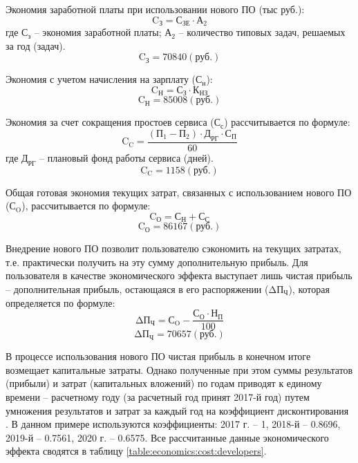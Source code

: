 Экономия заработной платы при использовании нового ПО (тыс руб.):
\begin{equation}
\label{sec:economics:effect:form_zp}
{\text{C}}_{\text{З}} = {\text{С}}_{\text{ЗЕ}} \cdot {\text{А}}_{\text{2}}
\end{equation}
где ${\text{С}}_{\text{з}}$ -- экономия заработной платы; ${\text{А}}_{\text{2}}$ -- количество типовых задач, решаемых за год (задач).
$${\text{C}}_{\text{З}} = 70840 (\text{руб.})$$

Экономия с учетом начисления на зарплату (${\text{С}}_{\text{н}}$):
\begin{equation}
\label{sec:economics:effect:form_nach}
{\text{C}}_{\text{Н}} = {\text{С}}_{\text{З}} \cdot {\text{К}}_{\text{НЗ}}
\end{equation}
$${\text{C}}_{\text{Н}} = 85008 (\text{руб.})$$

Экономия за счет сокращения простоев сервиса (${\text{С}}_{\text{с}}$) рассчитывается по  формуле:
\begin{equation}
\label{sec:economics:effect:form_prost}
{\text{C}}_{\text{C}} = \frac{ ( {\text{П}}_{\text{1}} - {\text{П}}_{\text{2}} ) \cdot {\text{Д}}_{\text{РГ}} \cdot {\text{С}}_{\text{П}} }{ 60 }
\end{equation}
где ${\text{Д}}_{\text{РГ}}$ -- плановый фонд работы сервиса (дней).
$${\text{C}}_{\text{C}} = 1158 (\text{руб.})$$

Общая готовая экономия текущих затрат, связанных с использованием нового ПО (${\text{С}}_{\text{O}}$), рассчитывается по формуле:
\begin{equation}
\label{sec:economics:effect:form_jew_big}
{\text{C}}_{\text{О}} = {\text{С}}_{\text{Н}} + {\text{С}}_{\text{С}}
\end{equation}
$${\text{C}}_{\text{О}} = 86167 (\text{руб.})$$

Внедрение нового ПО позволит пользователю сэкономить на текущих затратах, т.е. практически получить на эту сумму дополнительную прибыль. Для пользователя в качестве экономического эффекта выступает лишь чистая прибыль -- дополнительная прибыль, остающаяся в его распоряжении (${\text{ΔП}}_{\text{Ч}}$), которая определяется по формуле:
\begin{equation}
\label{sec:economics:effect:form_dpch}
{\text{ΔП}}_{\text{Ч}} = {\text{С}}_{\text{O}} - \frac{ {\text{С}}_{\text{О}} \cdot {\text{Н}}_{\text{П}} }{ 100 }
\end{equation}
$${\text{ΔП}}_{\text{Ч}} = 70657 (\text{руб.})$$

В процессе использования нового ПО чистая прибыль в конечном итоге
возмещает капитальные затраты. Однако полученные при этом суммы результатов (прибыли) и затрат (капитальных вложений) по годам приводят к единому времени -- расчетному году (за расчетный год принят 2017-й год) путем умножения результатов и затрат за каждый год на коэффициент дисконтирования . В данном примере используются коэффициенты: 2017 г. -- 1, 2018-й -- 0.8696, 2019-й -- 0.7561, 2020 г. -- 0.6575. Все рассчитанные данные экономического эффекта сводятся в таблицу \ref{table:economics:cost:developers}.



